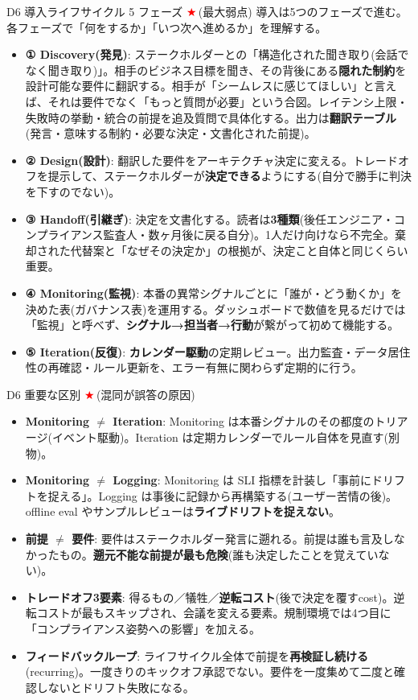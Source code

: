 \documentclass[10pt,a4paper]{article}
\newcommand{\R}[1]{\textcolor{cred}{\textbf{#1}}}
\newcommand{\B}[1]{\textcolor{cblue}{\textbf{#1}}}
\newcommand{\stc}{\textcolor{red}{\ensuremath{\bigstar}}\,}
\begin{document}
\begin{minipage}[t]{0.333\textwidth}

\begin{boxred}{D6 導入ライフサイクル 5 フェーズ \stc (最大弱点)}
導入は5つのフェーズで進む。各フェーズで「何をするか」「いつ次へ進めるか」を理解する。
\begin{itemize}
\item \R{① Discovery(発見)}: ステークホルダーとの「構造化された聞き取り(会話でなく聞き取り)」。相手のビジネス目標を聞き、その背後にある\R{隠れた制約}を設計可能な要件に翻訳する。相手が「シームレスに感じてほしい」と言えば、それは要件でなく「もっと質問が必要」という合図。レイテンシ上限・失敗時の挙動・統合の前提を追及質問で具体化する。出力は\B{翻訳テーブル}(発言・意味する制約・必要な決定・文書化された前提)。
\item \R{② Design(設計)}: 翻訳した要件をアーキテクチャ決定に変える。トレードオフを提示して、ステークホルダーが\B{決定できる}ようにする(自分で勝手に判決を下すのでない)。
\item \R{③ Handoff(引継ぎ)}: 決定を文書化する。読者は\B{3種類}(後任エンジニア・コンプライアンス監査人・数ヶ月後に戻る自分)。1人だけ向けなら不完全。棄却された代替案と「なぜその決定か」の根拠が、決定こと自体と同じくらい重要。
\item \R{④ Monitoring(監視)}: 本番の異常シグナルごとに「誰が・どう動くか」を決めた表(ガバナンス表)を運用する。ダッシュボードで数値を見るだけでは「監視」と呼べず、\B{シグナル→担当者→行動}が繋がって初めて機能する。
\item \R{⑤ Iteration(反復)}: \B{カレンダー駆動}の定期レビュー。出力監査・データ居住性の再確認・ルール更新を、エラー有無に関わらず定期的に行う。
\end{itemize}
\end{boxred}

\begin{boxred}{D6 重要な区別 \stc (混同が誤答の原因)}
\begin{itemize}
\item \R{Monitoring $\neq$ Iteration}: Monitoring は本番シグナルのその都度のトリアージ(イベント駆動)。Iteration は定期カレンダーでルール自体を見直す(別物)。
\item \R{Monitoring $\neq$ Logging}: Monitoring は SLI 指標を計装し「事前にドリフトを捉える」。Logging は事後に記録から再構築する(ユーザー苦情の後)。offline eval やサンプルレビューは\R{ライブドリフトを捉えない}。
\item \R{前提 $\neq$ 要件}: 要件はステークホルダー発言に遡れる。前提は誰も言及しなかったもの。\B{遡元不能な前提が最も危険}(誰も決定したことを覚えていない)。
\item \R{トレードオフ3要素}: 得るもの／犠牲／\B{逆転コスト}(後で決定を覆すcost)。逆転コストが最もスキップされ、会議を変える要素。規制環境では4つ目に「コンプライアンス姿勢への影響」を加える。
\item \R{フィードバックループ}: ライフサイクル全体で前提を\B{再検証し続ける}(recurring)。一度きりのキックオフ承認でない。要件を一度集めて二度と確認しないとドリフト失敗になる。
\end{itemize}
\end{boxred}

\end{minipage}\hfill
\end{document}
